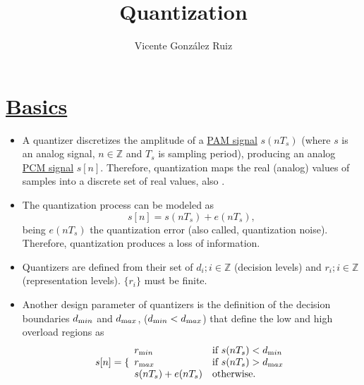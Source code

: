
\title{Quantization}

\author{Vicente González Ruiz}

\maketitle

\section{\href{https://en.wikipedia.org/wiki/Quantization\_(signal\_processing)}{Basics}}
\begin{itemize}
\tightlist

\item
  A quantizer discretizes the amplitude of a
  \href{https://en.wikipedia.org/wiki/Pulse-amplitude_modulation}{PAM
    signal} \(s(nT_s)\) (where $s$ is an analog signal,
  $n\in{\mathbb{Z}}$ and $T_s$ is sampling period), producing an
  analog
  \href{https://en.wikipedia.org/wiki/Pulse-code_modulation}{PCM
    signal} $s[n]$. Therefore, quantization maps the real (analog)
  values of samples into a discrete set of real values, also
  \cite{vetterli1995wavelets}.

\item
  The quantization process can be modeled as
  \begin{equation}
    s[n] = s(nT_s) + e(nT_s),
  \end{equation}
  being \(e(nT_s)\) the quantization error (also called, quantization
  noise). Therefore, quantization produces a loss of information.

\item
  Quantizers are defined from their set of \(d_i; i\in {\mathbb{Z}}\)
  (decision levels) and \(r_i; i\in {\mathbb{Z}}\) (representation
  levels). $\{r_i\}$ must be finite.

\item Another design parameter of quantizers is the definition of the
  decision boundaries $d_{\text min}$ and $d_{\text max}$, ($d_{\text min}<d_{\text max}$) that define the low and high
  overload regions as
  \begin{equation}
    s[n] = \{\begin{array}{ll}
    r_{\text min} & \text{if $s(nT_s)<d_{\text min}$} \\
    r_{\text max} & \text{if $s(nT_s)>d_{\text max}$} \\
    s(nT_s)+e(nT_s) & \text{otherwise}.
    \end{array}
  \end{equation}

\end{itemize}

